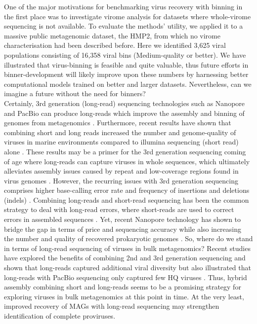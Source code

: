 One of the major motivations for benchmarking virus recovery with binning in the first place was to investigate virome analysis for datasets where whole-virome sequencing is not available. To evaluate the methods' utility, we applied it to a massive public metagenomic dataset, the HMP2, from which no virome characterisation had been described before. Here we identified 3,625 viral populations consisting of 16,358 viral bins (Medium-quality or better). We have illustrated that virus-binning is feasible and quite valuable, thus future efforts in binner-development will likely improve upon these numbers by harnessing better computational models trained on better and larger datasets. Nevertheless, can we imagine a future without the need for binners?\\ 

\noindent
Certainly, 3rd generation (long-read) sequencing technologies such as Nanopore and PacBio can produce long-reads which improve the assembly and binning of genomes from metagenomics \cite{Moss2020-ot,Sereika2022-ii}. Furthermore, recent results have shown that combining short and long reads increased the number and genome-quality of viruses in marine environments compared to illumina sequencing (short read) alone \cite{Zaragoza-Solas2022-ky}. These results may be a primer for the 3rd generation sequencing coming of age where long-reads can capture viruses in whole sequences, which ultimately alleviates assembly issues caused by repeat and low-coverage regions found in virus genomes \cite{Sutton2019-zv}. However, the recurring issues with 3rd generation sequencing comprises higher base-calling error rate and frequency of insertions and deletions (indels) \cite{Delahaye2021-ys}. Combining long-reads and short-read sequencing has been the common strategy to deal with long-read errors, where short-reads are used to correct errors in assembled sequences \cite{Wick2017-as}. Yet, recent Nanopore technology has shown to bridge the gap in terms of price and sequencing accuracy while also increasing the number and quality of recovered prokaryotic genomes \cite{Sereika2022-ii}. So, where do we stand in terms of long-read sequencing of viruses in bulk metagenomics? Recent studies have explored the benefits of combining 2nd and 3rd generation sequencing \cite{Zaragoza-Solas2022-ky,Yahara2021-jx} and shown that long-reads captured additional viral diversity but also illustrated that long-reads with PacBio sequencing only captured few HQ viruses \cite{Zaragoza-Solas2022-ky}. Thus, hybrid assembly combining short and long-reads seems to be a promising strategy for exploring viruses in bulk metagenomics at this point in time. At the very least, improved recovery of MAGs with long-read sequencing may strengthen identification of complete proviruses.

